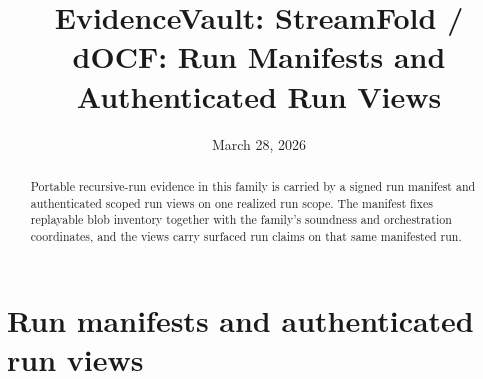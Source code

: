 \documentclass[11pt]{article}
\title{EvidenceVault: StreamFold / dOCF: Run Manifests and Authenticated Run Views}
\author{}
\date{March 28, 2026}
\begin{document}
\maketitle

\begin{abstract}
Portable recursive-run evidence in this family is carried by a signed run manifest and authenticated scoped run views on one realized run scope.
The manifest fixes replayable blob inventory together with the family's soundness and orchestration coordinates, and the views carry surfaced run claims on that same manifested run.
\end{abstract}

\section{Run manifests and authenticated run views}
\end{document}
